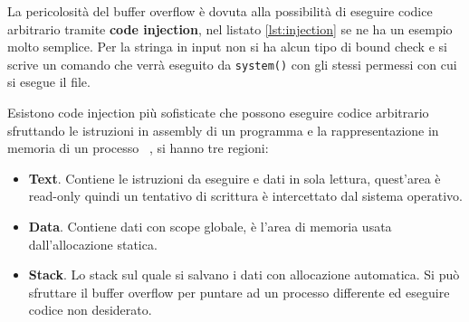 \documentclass[Lau,binding=0.6cm]{sapthesis}
\newcommand{\textcode}[1]{\colorbox{backcolour}{\texttt{#1}}}
\begin{document}








La pericolosità del buffer overflow è dovuta alla possibilità di eseguire codice arbitrario tramite \textbf{code injection}, nel listato \ref{lst:injection} se ne ha un esempio molto semplice. 
Per la stringa in input non si ha alcun tipo di bound check e si scrive un comando che verrà eseguito da \textcode{system()} con gli stessi permessi con cui si esegue il file. 




Esistono code injection più sofisticate che possono eseguire codice arbitrario sfruttando le istruzioni in assembly di un programma e la rappresentazione in memoria di un processo ~\cite{stack_smashing_ffp}, si hanno tre regioni:

\begin{itemize}
	\item \textbf{Text}. Contiene le istruzioni da eseguire e dati in sola lettura, quest'area è read-only quindi un tentativo di scrittura è intercettato dal sistema operativo. 
    	\item \textbf{Data}. Contiene dati con scope globale, è l'area di memoria usata dall'allocazione statica.
    	\item \textbf{Stack}. Lo stack sul quale si salvano i dati con allocazione automatica.
		Si può sfruttare il buffer overflow per puntare ad un processo differente ed eseguire codice non desiderato.
\end{itemize}
\end{document}
